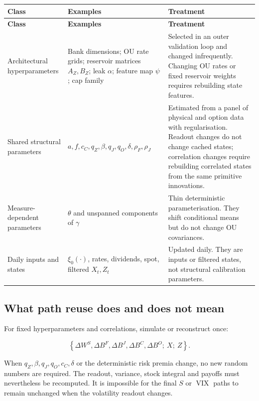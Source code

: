 \documentclass[11pt,a4paper]{article}
\newcommand{\VIX}{\operatorname{VIX}}
\begin{document}
\begin{longtable}{@{}L{32mm}L{52mm}L{58mm}@{}}
\toprule
\textbf{Class} & \textbf{Examples} & \textbf{Treatment} \\
\midrule
\endfirsthead
\toprule
\textbf{Class} & \textbf{Examples} & \textbf{Treatment} \\
\midrule
\endhead
Architectural hyperparameters
& Bank dimensions; OU rate grids; reservoir matrices \(A_Z,B_Z\); leak \(\alpha\);
feature map \(\psi\); cap family
& Selected in an outer validation loop and changed infrequently. Changing OU rates or fixed
reservoir weights requires rebuilding state features. \\
\addlinespace
Shared structural parameters
& \(a,f,c_C,q_Z,\beta,q_J,q_O,\delta,\rho_F,\rho_J\)
& Estimated from a panel of physical and option data with regularisation. Readout changes do
not change cached states; correlation changes require rebuilding correlated states from the
same primitive innovations. \\
\addlinespace
Measure-dependent parameters
& \(\theta\) and unspanned components of \(\gamma\)
& Thin deterministic parameterisation. They shift conditional means but do not change OU
covariances. \\
\addlinespace
Daily inputs and states
& \(\xi_0(\cdot)\), rates, dividends, spot, filtered \(X_t,Z_t\)
& Updated daily. They are inputs or filtered states, not structural calibration parameters. \\
\bottomrule
\end{longtable}

\subsection{What path reuse does and does not mean}

For fixed hyperparameters and correlations, simulate or reconstruct once:

\begin{equation}
\left\{\Delta W^S,\Delta B^F,\Delta B^J,\Delta B^C,\Delta B^O;\ X;\ Z\right\}.
\end{equation}

When \(q_Z,\beta,q_J,q_O,c_C,\delta\) or the deterministic risk premia change, no new random
numbers are required. The readout, variance, stock integral and payoffs must nevertheless be
recomputed. It is impossible for the final \(S\) or \(\VIX\) paths to remain unchanged when
the volatility readout changes.
\end{document}
